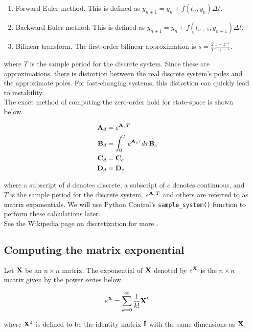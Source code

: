 \begin{enumerate}
  \item Forward Euler method. This is defined as
    $y_{n+1} = y_n + f(t_n, y_n) \Delta t$.
  \item Backward Euler method. This is defined as
    $y_{n+1} = y_n + f(t_{n+1}, y_{n+1}) \Delta t$.
  \item Bilinear transform. The first-order bilinear approximation is
    $s = \frac{2}{T} \frac{1 - z^{-1}}{1 + z^{-1}}$. \\
\end{enumerate}

\noindent where $T$ is the sample period for the discrete system. Since these
are approximations, there is distortion between the real discrete system's poles
and the approximate poles. For fast-changing systems, this distortion can
quickly lead to instability. \\

The exact method of computing the zero-order hold for state-space is shown
below.

\begin{align}
  \mathbf{A}_d &= e^{\mathbf{A}_c T} \\
  \mathbf{B}_d &= \int_0^T e^{\mathbf{A}_c \tau} d\tau \mathbf{B}_c \\
  \mathbf{C}_d &= \mathbf{C}_c \\
  \mathbf{D}_d &= \mathbf{D}_c
\end{align}

\noindent where a subscript of $d$ denotes discrete, a subscript of $c$ denotes
continuous, and $T$ is the sample period for the discrete system.
$e^{\mathbf{A}_c T}$ and others are referred to as matrix exponentials. We will use
Python Control's \texttt{sample\_system()} function to perform these
calculations later. \\

See the Wikipedia page on discretization for more \cite{bib:discretization}.

\subsection{Computing the matrix exponential}

Let $\mathbf{X}$ be an $n \times n$ matrix. The exponential of $\mathbf{X}$ denoted by
$e^{\mathbf{X}}$ is the $n \times n$ matrix given by the power series below.

\begin{equation}
  e^{\mathbf{X}} = \sum_{k=0}^\infty \frac{1}{k!} \mathbf{X}^k
\end{equation}

\noindent where $\mathbf{X}^0$ is defined to be the identity matrix $\mathbf{I}$ with
the same dimensions as $\mathbf{X}$.
